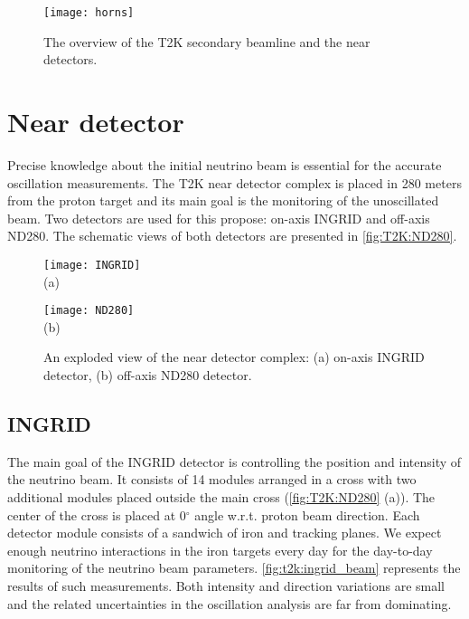 \documentclass[../main.tex]{subfiles}
\begin{document}

\begin{figure}[!ht]
  \centering
  \texttt{[image: horns]}
  \caption{The overview of the T2K secondary beamline and the near detectors.}
  \label{fig:t2k:horns}
\end{figure}

\section{Near detector}
\label{sec:T2K:nd}
Precise knowledge about the initial neutrino beam is essential for the accurate oscillation measurements. The T2K near detector complex is placed in 280 meters from the proton target and its main goal is the monitoring of the unoscillated beam. Two detectors are used for this propose: on-axis INGRID and off-axis ND280. The schematic views of both detectors are presented in \autoref{fig:T2K:ND280}.

\begin{figure}[!ht]
  \centering
  \begin{minipage}{0.49\linewidth}
    \centering
    \texttt{[image: INGRID]} \\ (a)
  \end{minipage}
  \begin{minipage}{0.49\linewidth}
    \centering
    \texttt{[image: ND280]} \\ (b)
  \end{minipage}
    \caption{An exploded view of the near detector complex: (a) on-axis INGRID detector, (b) off-axis ND280 detector.}
    \label{fig:T2K:ND280}
\end{figure}

\subsection{INGRID}
The main goal of the INGRID detector is controlling the position and intensity of the neutrino beam. It consists of 14 modules arranged in a cross with two additional modules placed outside the main cross (\autoref{fig:T2K:ND280} (a)). The center of the cross is placed at 0$^\circ$ angle w.r.t. proton beam direction. Each detector module consists of a sandwich of iron and tracking planes. We expect enough neutrino interactions in the iron targets every day for the day-to-day monitoring of the neutrino beam parameters. \autoref{fig:t2k:ingrid_beam} represents the results of such measurements. Both intensity and direction variations are small and the related uncertainties in the oscillation analysis are far from dominating.
\end{document}
